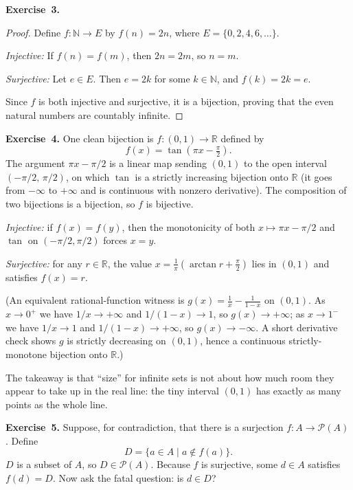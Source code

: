 \documentclass[11pt]{article}
\begin{document}
\medskip
\textbf{Exercise~3.}
\begin{proof}
Define $f : \mathbb{N} \to E$ by $f(n) = 2n$, where
$E = \{0, 2, 4, 6, \ldots\}$.

\emph{Injective:} If $f(n) = f(m)$, then $2n = 2m$, so $n = m$.

\emph{Surjective:} Let $e \in E$.  Then $e = 2k$ for some $k \in \mathbb{N}$,
and $f(k) = 2k = e$.

Since $f$ is both injective and surjective, it is a bijection, proving that
the even natural numbers are countably infinite.
\end{proof}

\medskip
\textbf{Exercise~4.}
One clean bijection is $f : (0, 1) \to \mathbb{R}$ defined by
\[
  f(x) = \tan\!\left(\pi x - \tfrac{\pi}{2}\right).
\]
The argument $\pi x - \pi/2$ is a linear map sending $(0, 1)$ to the open
interval $(-\pi/2,\, \pi/2)$, on which $\tan$ is a strictly increasing
bijection onto $\mathbb{R}$ (it goes from $-\infty$ to $+\infty$ and is
continuous with nonzero derivative). The composition of two bijections is
a bijection, so $f$ is bijective.

\emph{Injective:} if $f(x) = f(y)$, then the monotonicity of both
$x \mapsto \pi x - \pi/2$ and $\tan$ on $(-\pi/2, \pi/2)$ forces $x = y$.

\emph{Surjective:} for any $r \in \mathbb{R}$, the value
$x = \frac{1}{\pi}\!\left(\arctan r + \frac{\pi}{2}\right)$ lies in
$(0, 1)$ and satisfies $f(x) = r$.

(An equivalent rational-function witness is $g(x) = \frac{1}{x} -
\frac{1}{1 - x}$ on $(0, 1)$. As $x \to 0^+$ we have $1/x \to +\infty$
and $1/(1-x) \to 1$, so $g(x) \to +\infty$; as $x \to 1^-$ we have
$1/x \to 1$ and $1/(1-x) \to +\infty$, so $g(x) \to -\infty$. A short
derivative check shows $g$ is strictly decreasing on $(0, 1)$, hence a
continuous strictly-monotone bijection onto $\mathbb{R}$.)

The takeaway is that ``size'' for infinite sets is not about how much
room they appear to take up in the real line: the tiny interval
$(0, 1)$ has exactly as many points as the whole line.

\medskip
\textbf{Exercise~5.}
Suppose, for contradiction, that there is a surjection
$f : A \to \mathcal{P}(A)$.  Define
\[
  D = \{a \in A \mid a \notin f(a)\}.
\]
$D$ is a subset of $A$, so $D \in \mathcal{P}(A)$.  Because $f$ is
surjective, some $d \in A$ satisfies $f(d) = D$.  Now ask the fatal
question: is $d \in D$?
\end{document}
